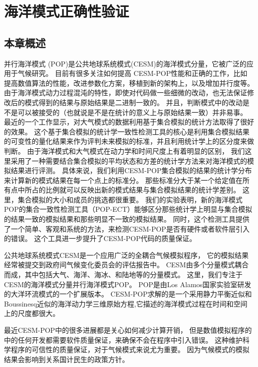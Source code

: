 \chapter{海洋模式正确性验证}
\label{cha:verify}

\section{本章概述}
\label{verify:intro}
并行海洋模式 (POP)是公共地球系统模式(CESM)的海洋模式分量，它被广泛的应用于气候研究。 
目前有很多关注如何提高  CESM-POP性能和正确的工作，比如提高数值算法的性能，改进参数化方案，移植到新的架构上，以及增加并行度等。 
由于海洋模式动力过程混沌的特性，即使对代码做一些细微的改动，也无法保证修改后的模式得到的结果与原始结果是二进制一致的。 
并且，判断模式中的改动是不是可以被接受的（也就说是不是在统计的意义上与原始结果一致）并非易事。 
最近的一个工作显示，对大气模式的数据利用基于集合模拟的统计方法取得了很好的效果。
这个基于集合模拟的统计学一致性检测工具的核心是利用集合模拟结果的可变性的量化结果来作为评判未来模拟的标准，并且利用统计学上的区分度来做判断。 
由于海洋模式和大气模式在动力学和时间尺度上有着明显的区别， 我们这里采用了一种需要结合集合模拟的平均状态和方差的统计学方法来对海洋模式的模拟结果进行评测。 
具体来说，我们利用CESM-POP集合模拟的结果的统计学分布来计算新的模式结果在每一个点上的标准分。 
那些标准分大于某一个给定值在所有点中所占的比例就可以反映出新的模式结果与集合模拟结果的统计学差别。 
这里，集合模拟的大小和成员的挑选都很重要。
我们的实验表明，新的海洋模式POP的集合一致性检测工具（POP-ECT）能够区分那些统计学上明显与集合模拟的结果一致的模拟结果和那些明显不一致的模拟结果。 
同时，这个检测工具提供了一个简单、客观和系统的方法，来检测CESM-POP是否有硬件或者软件层引入的错误。
这个工具进一步提升了CESM-POP代码的质量保证。 

公共地球系统模式CESM是一个应用广泛的全耦合气候模拟程序\cite{hurrell2013community}， 它的模拟结果经常被提交到政府间气候变化委员会的评估报告中\cite{stocker2013ipcc}。
CESM由多个分量模式耦合而成，其中包括大气、海洋、海冰、和陆地等的分量模式。 
这里，我们专注于CESM的海洋模式分量并行海洋模式POP。 POP是由Los Alamos国家实验室研发的大洋环流模式的一个扩展版本。 
CESM-POP求解的是一个采用静力平衡近似和Boussinesq近似的海洋动力学三维原始方程,它描述的海洋模式过程在时间和空间上的尺度都很大。  

 
 
最近CESM-POP中的很多进展都是关心如何减少计算开销\cite{yong2015}， 但是数值模拟程序的中的任何开发都需要软件质量保证，来确保不会在程序中引入错误。 
这种维护科学程序的可信性的质量保证，对于气候模式来说尤为重要。 
因为气候模式的模拟结果会影响到关系国计民生的政策方针\cite{carson2002, easterbrook2011}。 

